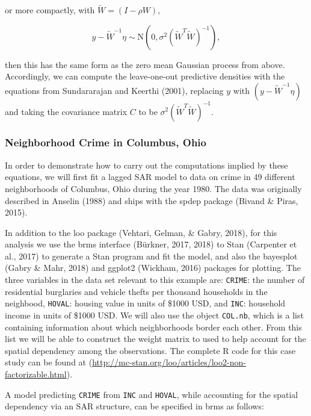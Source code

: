 \documentclass[english,,doc,floatsintext]{apa6}
\theoremstyle{definition}
\theoremstyle{definition}
\theoremstyle{definition}
\theoremstyle{remark}
\begin{document}
or more compactly, with \(\widetilde{W}=(I-\rho W)\),

\begin{equation}
y-\widetilde{W}^{-1}\eta \sim {\mathrm N}(0, \sigma^2(\widetilde{W}^{T}\widetilde{W})^{-1}),
\end{equation}

then this has the same form as the zero mean Gaussian process from
above. Accordingly, we can compute the leave-one-out predictive
densities with the equations from Sundararajan and Keerthi (2001),
replacing \(y\) with \((y-\widetilde{W}^{-1}\eta)\) and taking the
covariance matrix \(C\) to be
\(\sigma^2(\widetilde{W}^{T}\widetilde{W})^{-1}\).

\hypertarget{neighborhood-crime-in-columbus-ohio}{%
\subsubsection{Neighborhood Crime in Columbus,
Ohio}\label{neighborhood-crime-in-columbus-ohio}}

In order to demonstrate how to carry out the computations implied by
these equations, we will first fit a lagged SAR model to data on crime
in 49 different neighborhoods of Columbus, Ohio during the year 1980.
The data was originally described in Anselin (1988) and ships with the
spdep package (Bivand \& Piras, 2015).

In addition to the loo package (Vehtari, Gelman, \& Gabry, 2018), for
this analysis we use the brms interface (Bürkner, 2017, 2018) to Stan
(Carpenter et al., 2017) to generate a Stan program and fit the model,
and also the bayesplot (Gabry \& Mahr, 2018) and ggplot2 (Wickham, 2016)
packages for plotting. The three variables in the data set relevant to
this example are: \texttt{CRIME}: the number of residential burglaries
and vehicle thefts per thousand households in the neighbood,
\texttt{HOVAL}: housing value in units of \$1000 USD, and \texttt{INC}:
household income in units of \$1000 USD. We will also use the object
\texttt{COL.nb}, which is a list containing information about which
neighborhoods border each other. From this list we will be able to
construct the weight matrix to used to help account for the spatial
dependency among the observations. The complete R code for this case
study can be found at
(\url{http://mc-stan.org/loo/articles/loo2-non-factorizable.html}).

A model predicting \texttt{CRIME} from \texttt{INC} and \texttt{HOVAL},
while accounting for the spatial dependency via an SAR structure, can be
specified in brms as follows:
\end{document}
